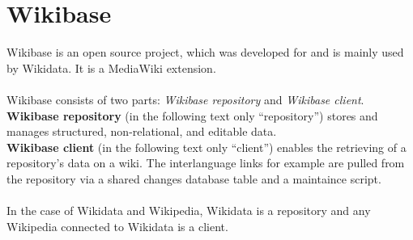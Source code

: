 \section{Wikibase}
Wikibase is an open source project, which was developed for and is mainly used by Wikidata. It is a MediaWiki extension. \\
\\
Wikibase consists of two parts: \textit{Wikibase repository} and \textit{Wikibase client}. \textbf{Wikibase repository} (in the following text only ``repository'')  stores and manages structured, non-relational, and editable data. \citep{wikibase:01} \\
\textbf{Wikibase client} (in the following text only ``client'') enables the retrieving of a repository's data on a wiki. \citep{wikibase:01} The interlanguage links for example are pulled from the repository via a shared changes database table and a maintaince script. \citep{wiki:18} \\
\\
In the case of Wikidata and Wikipedia, Wikidata is a repository and any Wikipedia connected to Wikidata is a client.